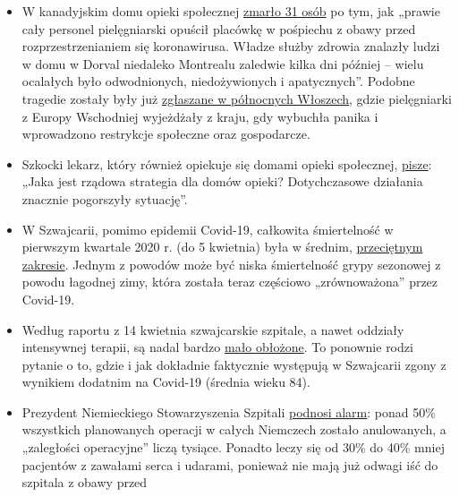 \begin{itemize}
{  w dużej mierze pusty}, tylko 19 pacjentów było leczonych w ośrodku w
  weekend wielkanocny. Londyńskie szpitale podwoiły swoje możliwości na
  OIOM-ach i jak dotąd radzą sobie z ilością chorych.
\item
  W kanadyjskim domu opieki społecznej
  \href{https://www.nytimes.com/2020/04/16/world/canada/montreal-nursing-homes-coronavirus.html}{zmarło
  31 osób} po tym, jak „prawie cały personel pielęgniarski opuścił
  placówkę w pośpiechu z obawy przed rozprzestrzenianiem się
  koronawirusa. Władze służby zdrowia znalazły ludzi w domu w Dorval
  niedaleko Montrealu zaledwie kilka dni później -- wielu ocalałych było
  odwodnionych, niedożywionych i apatycznych''. Podobne tragedie zostały
  były już
  \href{https://swprs.org/covid-19-a-report-from-italy/}{zgłaszane w
  północnych Włoszech}, gdzie pielęgniarki z Europy Wschodniej
  wyjeżdżały z kraju, gdy wybuchła panika i wprowadzono restrykcje
  społeczne oraz gospodarcze.
\item
  Szkocki lekarz, który również opiekuje się domami opieki społecznej,
  \href{https://drmalcolmkendrick.org/2020/04/17/care-homes-and-covid19/}{pisze}:
  „Jaka jest rządowa strategia dla domów opieki? Dotychczasowe działania
  znacznie pogorszyły sytuację''.
\item
  W Szwajcarii, pomimo epidemii Covid-19, całkowita śmiertelność w
  pierwszym kwartale 2020 r. (do 5 kwietnia) była w średnim,
  \href{https://swprs.files.wordpress.com/2020/04/ch-mortalitaet-q1-2020.pdf}{przeciętnym
  zakresie}. Jednym z powodów może być niska śmiertelność grypy
  sezonowej z powodu łagodnej zimy, która została teraz częściowo
  „zrównoważona'' przez Covid-19.
\item
  Według raportu z 14 kwietnia szwajcarskie szpitale, a nawet oddziały
  intensywnej terapii, są nadal bardzo
  \href{https://swprs.files.wordpress.com/2020/04/intensivbettenbelegung-schweiz-2020-04-14.png}{mało
  obłożone}. To ponownie rodzi pytanie o to, gdzie i jak dokładnie
  faktycznie występują w Szwajcarii zgony z wynikiem dodatnim na
  Covid-19 (średnia wieku 84).
\item
  Prezydent Niemieckiego Stowarzyszenia Szpitali
  \href{https://www.bz-berlin.de/deutschland/kliniken-verband-schlaegt-alarm-wegen-corona-regeln}{podnosi
  alarm}: ponad 50\% wszystkich planowanych operacji w całych Niemczech
  zostało anulowanych, a „zaległości operacyjne'' liczą tysiące. Ponadto
  leczy się od 30\% do 40\% mniej pacjentów z zawałami serca i udarami,
  ponieważ nie mają już odwagi iść do szpitala z obawy przed

\end{itemize}
